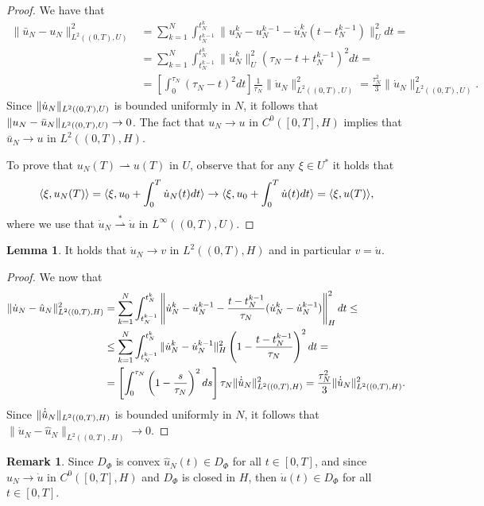 \documentclass[a4paper,10pt,oneside]{amsbook}
\numberwithin{section}{chapter}
\numberwithin{equation}{chapter}
\theoremstyle{definition}
\newtheorem{lemma}[prop]{Lemma}
\newtheorem{rmk}[prop]{Remark}
\DeclarePairedDelimiter{\norm}{\lVert}{\rVert}
\DeclarePairedDelimiter{\dual}{\langle}{\rangle}
\begin{document}
\begin{proof}
We have that
\[
\begin{split}
\|\bar{u}_N-u_N\|_{L^2((0,T),U)}^2&=\sum_{k=1}^N\int_{t_N^{k-1}}^{t_N^k}\|u_N^k-u_N^{k-1}-\dot{u}_N^k(t-t_N^{k-1})\|_U^2dt=\\
&=\sum_{k=1}^N\int_{t_N^{k-1}}^{t_N^k}\|\dot{u}_N^k\|_U^2\left(\tau_N-t+t_N^{k-1}\right)^2dt=\\
&=\left[\int_0^{\tau_N}(\tau_N-t)^2dt\right]\frac{1}{\tau_N}\|\dot{u}_N\|_{L^2((0,T),U)}^2=\frac{\tau_N^2}{3}\|\dot{u}_N\|_{L^2((0,T),U)}^2.
\end{split}
\]
Since $\norm{\dot u_N}_{L^2((0,T),U)}$ is bounded uniformly in $N$, it follows that $\norm{u_N-\bar u_N}_{L^2((0,T),U)}\to0$. The fact that $u_N\to u$ in $C^0([0,T],H)$ implies that $\bar u_N\to u$ in $L^2((0,T),H)$.

To prove that $u_N(T)\rightharpoonup u(T)$ in $U$, observe that for any $\xi\in U^*$ it holds that
\[
\langle\xi,u_N(T)\rangle=\langle\xi,u_0+\int_0^T\dot{u}_N(t)dt\rangle\to\langle\xi,u_0+\int_0^T\dot{u}(t)dt\rangle=\dual{\xi,u(T)},
\]
where we use that $\dot u_N\overset{*}{\rightharpoonup}\dot u$ in $L^\infty((0,T),U)$.
\end{proof}
\begin{lemma}
It holds that $\dot u_N\to v$ in $L^2((0,T),H)$ and in particular $v=\dot u$.
\end{lemma}
\begin{proof}
We now that
\[
\begin{split}
\|\dot{u}_N-\hat{u}_N\|_{L^2((0,T),H)}^2&=\sum_{k=1}^N\int_{t_N^{k-1}}^{t_N^k}\left\|\dot{u}_N^k-\dot{u}_N^{k-1}-\frac{t-t_N^{k-1}}{\tau_N}(\dot{u}_N^k-\dot{u}_N^{k-1})\right\|_H^2dt\le\\
&\le\sum_{k=1}^N\int_{t_N^{k-1}}^{t_N^k}\|\dot{u}_N^k-\dot{u}_N^{k-1}\|_H^2\left(1-\frac{t-t_N^{k-1}}{\tau_N}\right)^2dt=\\
&=\left[\int_0^{\tau_N}\left(1-\frac{s}{\tau_N}\right)^2ds\right]\tau_N\norm{\dot{\hat{u}}_N}_{L^2((0,T),H)}^2=\frac{\tau_N^2}{3}\norm{\dot{\hat{u}}_N}_{L^2((0,T),H)}^2.
\end{split}
\]
Since $\norm{\dot{\hat{u}}_N}_{L^2((0,T),H)}$ is bounded uniformly in $N$, it follows that $\|\dot{u}_N-\hat{u}_N\|_{L^2((0,T),H)}\to0$.
\end{proof}
\begin{rmk}
Since $D_\Phi$ is convex $\hat u_N(t)\in D_\Phi$ for all $t\in[0,T]$, and since $\hat u_N\to\dot u$ in $C^0([0,T],H)$ and $D_\Phi$ is closed in $H$, then $\dot u(t)\in D_\Phi$ for all $t\in[0,T]$.
\end{rmk}
\end{document}
